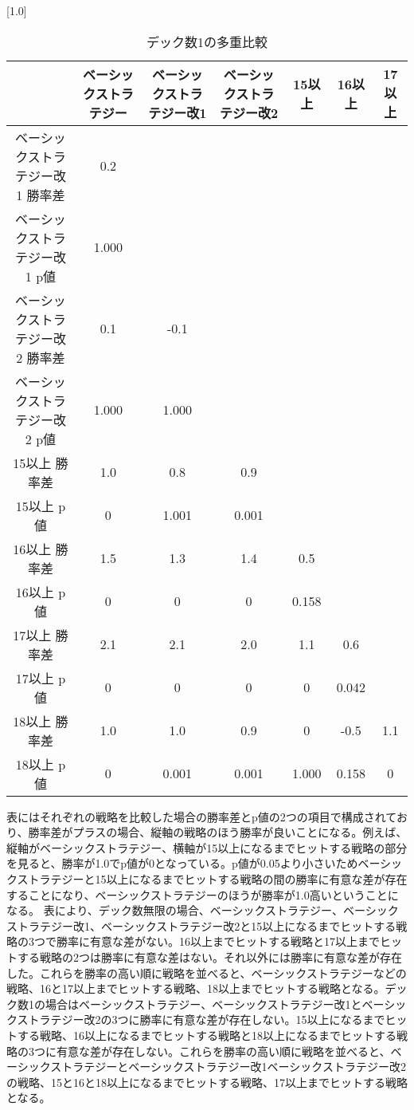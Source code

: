 \begin{table}[H]
 \begin{center}
 \small
 \scalebox{0.8}[1.0]{
  \begin{tabular}{|c|c|c|c|c|c|c|}
    \hline & ベーシックストラテジー & ベーシックストラテジー改1 & ベーシックストラテジー改2 & 15以上 & 16以上 & 17以上 \\
    \hline ベーシックストラテジー改1 勝率差 & 0.2 &  &  &  &  &   \\
    ベーシックストラテジー改1 p値 & 1.000 &  &  &  &  &    \\
    \hline ベーシックストラテジー改2 勝率差 & 0.1 & -0.1 & & & &  \\
    ベーシックストラテジー改2 p値 & 1.000 & 1.000 & & & &   \\
    \hline 15以上 勝率差 & 1.0 & 0.8 & 0.9 & & &   \\
    15以上 p値 & 0 & 1.001 & 0.001 & & &  \\
    \hline 16以上 勝率差 & 1.5 & 1.3 & 1.4 & 0.5 & &  \\
    16以上 p値 & 0 & 0 & 0 & 0.158 & &  \\
    \hline 17以上 勝率差 & 2.1 & 2.1 & 2.0 & 1.1 & 0.6 &  \\
    17以上 p値 & 0 & 0 & 0 & 0 & 0.042 & \\
    \hline 18以上 勝率差 & 1.0 & 1.0 & 0.9 & 0 & -0.5 & 1.1  \\
    18以上 p値 & 0 & 0.001 & 0.001 & 1.000 & 0.158 & 0  \\
    \hline
  \end{tabular}
 }
 \end{center}
 \caption{デック数1の多重比較}
\end{table}
表にはそれぞれの戦略を比較した場合の勝率差とp値の2つの項目で構成されており、勝率差がプラスの場合、縦軸の戦略のほう勝率が良いことになる。例えば、縦軸がベーシックストラテジー、横軸が15以上になるまでヒットする戦略の部分を見ると、勝率が1.0でp値が0となっている。p値が0.05より小さいためベーシックストラテジーと15以上になるまでヒットする戦略の間の勝率に有意な差が存在することになり、ベーシックストラテジーのほうが勝率が1.0高いということになる。
表により、デック数無限の場合、ベーシックストラテジー、ベーシックストラテジー改1、ベーシックストラテジー改2と15以上になるまでヒットする戦略の3つで勝率に有意な差がない。16以上までヒットする戦略と17以上までヒットする戦略の2つは勝率に有意な差はない。それ以外には勝率に有意な差が存在した。これらを勝率の高い順に戦略を並べると、ベーシックストラテジーなどの戦略、16と17以上までヒットする戦略、18以上までヒットする戦略となる。デック数1の場合はベーシックストラテジー、ベーシックストラテジー改1とベーシックストラテジー改2の3つに勝率に有意な差が存在しない。15以上になるまでヒットする戦略、16以上になるまでヒットする戦略と18以上になるまでヒットする戦略の3つに有意な差が存在しない。これらを勝率の高い順に戦略を並べると、ベーシックストラテジーとベーシックストラテジー改1ベーシックストラテジー改2の戦略、15と16と18以上になるまでヒットする戦略、17以上までヒットする戦略となる。

